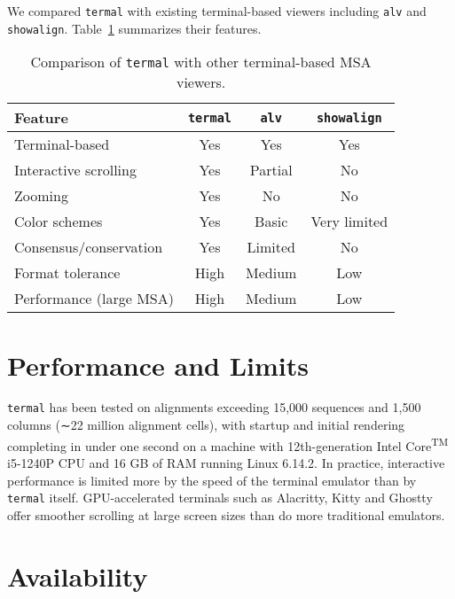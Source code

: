 \documentclass[11pt]{article}
\begin{document}
We compared \texttt{termal} with existing terminal-based viewers including
\texttt{alv} and \texttt{showalign}. Table~\ref{tab:comparison} summarizes their
features.

\begin{table}[h]
\centering
\begin{tabular}{lccc}
\hline
Feature                 & \texttt{termal} & \texttt{alv} & \texttt{showalign} \\
\hline
Terminal-based          & Yes             & Yes          & Yes                \\
Interactive scrolling   & Yes             & Partial      & No                 \\
Zooming                 & Yes             & No           & No                 \\
Color schemes           & Yes             & Basic        & Very limited       \\
Consensus/conservation  & Yes             & Limited      & No                 \\
Format tolerance        & High            & Medium       & Low                \\
Performance (large MSA) & High            & Medium       & Low                \\
\hline
\end{tabular}
\caption{Comparison of \texttt{termal} with other terminal-based MSA viewers.}
\label{tab:comparison}
\end{table}

\section*{Performance and Limits}

\texttt{termal} has been tested on alignments exceeding 15,000 sequences and
1,500 columns (∼22 million alignment cells), with startup and initial rendering
completing in under one second on a machine with 12th-generation
Intel\textregistered{} Core\textsuperscript{TM} i5-1240P CPU and 16 GB of RAM
running Linux 6.14.2. In practice, interactive performance is limited more by
the speed of the terminal emulator than by \texttt{termal} itself.
GPU-accelerated terminals such as Alacritty\cite{alacritty}, Kitty\cite{kitty}
and Ghostty\cite{ghostty} offer smoother scrolling at large screen sizes than do
more traditional emulators.

\section*{Availability}
\end{document}
